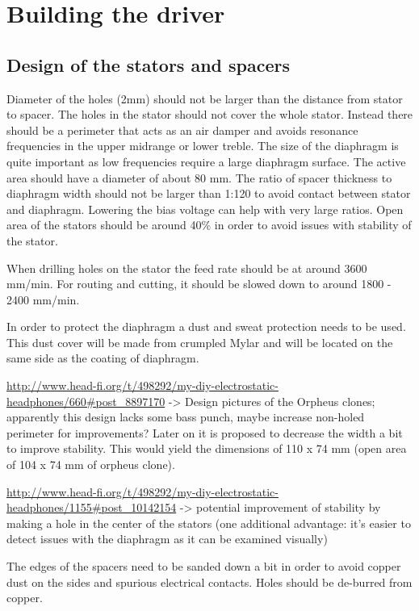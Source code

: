 \documentclass{article}
\begin{document}
\section{Building the driver}
\label{s:driver}

\subsection{Design of the stators and spacers}
\label{s:driver:design}
Diameter of the holes (2mm) should not be larger than the distance from stator to spacer. The holes in the stator should not cover the whole stator. Instead there should be a perimeter that acts as an air damper and avoids resonance frequencies in the upper midrange or lower treble. The size of the diaphragm is quite important as low frequencies require a large diaphragm surface. The active area should have a diameter of about 80 mm. The ratio of spacer thickness to diaphragm width should not be larger than 1:120 to avoid contact between stator and diaphragm. Lowering the bias voltage can help with very large ratios. Open area of the stators should be around 40\% in order to avoid issues with stability of the stator.

When drilling holes on the stator the feed rate should be at around 3600 mm/min.  For routing and cutting, it should be slowed down to around 1800 - 2400 mm/min.

In order to protect the diaphragm a dust and sweat protection needs to be used. This dust cover will be made from crumpled Mylar and will be located on the same side as the coating of diaphragm.

\url{http://www.head-fi.org/t/498292/my-diy-electrostatic-headphones/660#post_8897170} -> Design pictures of the Orpheus clones; apparently this design lacks some bass punch, maybe increase non-holed perimeter for improvements? Later on it is proposed to decrease the width a bit to improve stability. This would yield the dimensions of 110 x 74 mm (open area of 104 x 74 mm of orpheus clone).

\url{http://www.head-fi.org/t/498292/my-diy-electrostatic-headphones/1155#post_10142154} -> potential improvement of stability by making a hole in the center of the stators (one additional advantage: it's easier to detect issues with the diaphragm as it can be examined visually)

The edges of the spacers need to be sanded down a bit in order to avoid copper dust on the sides and spurious electrical contacts. Holes should be de-burred from copper.
\end{document}
